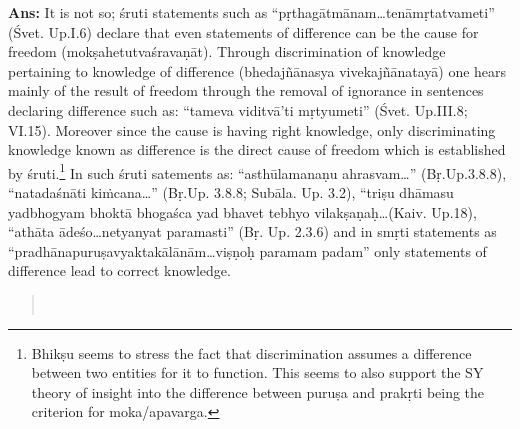 \textbf{Ans:} It is not so; śruti statements such as “pṛthagātmānam…tenāmṛ\-tatvameti” (Śvet. Up.I.6) declare that even statements of difference can be the cause for freedom (mokṣahetutvaśravaṇāt). Through discrimination of knowledge pertaining to knowledge of difference (bhedajñānasya vivekajñānatayā) one hears mainly of the result of freedom through the removal of ignorance in sentences declaring difference such as: “tameva viditvā’ti mṛtyumeti” (Śvet. Up.III.8; VI.15). Moreover  since the cause  is having right knowledge, only discriminating knowledge known as difference is the direct cause of freedom which is established by śruti.\footnote{Bhikṣu seems to stress the fact that discrimination assumes a difference between two entities for it to function. This seems to also support the SY theory of insight into the difference between puruṣa and prakṛti being the criterion for moka/apavarga.} In such śruti satements as: “asthūlamanaṇu ahrasvam…” (Bṛ.Up.3.8.8), “natadaśnāti kiṁcana…” (Bṛ.Up. 3.8.8; Subāla. Up. 3.2), “triṣu dhāmasu yadbhogyam bhoktā bhogaśca yad bhavet tebhyo vilakṣaṇaḥ…(Kaiv. Up.18), “athāta ādeśo…netyanyat paramasti” (Bṛ. Up. 2.3.6) and in smṛti statements as “pradhānapuruṣavyaktakālānām…viṣṇoḥ paramam padam” only statements of difference lead to correct knowledge. 


\begin{verse}
\\
\end{verse}

